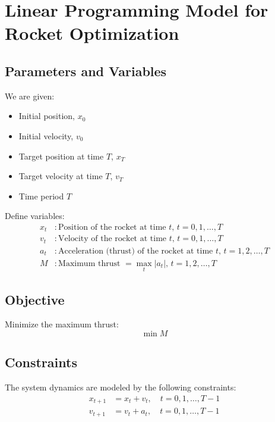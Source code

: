 \documentclass{article}
\begin{document}
\section*{Linear Programming Model for Rocket Optimization}

\subsection*{Parameters and Variables}

We are given:
\begin{itemize}
    \item Initial position, $x_0$
    \item Initial velocity, $v_0$
    \item Target position at time $T$, $x_T$
    \item Target velocity at time $T$, $v_T$
    \item Time period $T$
\end{itemize}

Define variables:
\begin{align*}
    x_t &: \text{Position of the rocket at time } t, \, t = 0, 1, \ldots, T \\
    v_t &: \text{Velocity of the rocket at time } t, \, t = 0, 1, \ldots, T \\
    a_t &: \text{Acceleration (thrust) of the rocket at time } t, \, t = 1, 2, \ldots, T \\
    M &: \text{Maximum thrust } = \max_t |a_t|, \, t = 1, 2, \ldots, T
\end{align*}

\subsection*{Objective}

Minimize the maximum thrust:
\[
\min M
\]

\subsection*{Constraints}

The system dynamics are modeled by the following constraints:
\begin{align}
    x_{t+1} &= x_t + v_t, \quad t = 0, 1, \ldots, T-1 \label{eq:position_update} \\
    v_{t+1} &= v_t + a_t, \quad t = 0, 1, \ldots, T-1 \label{eq:velocity_update}
\end{align}
\end{document}
